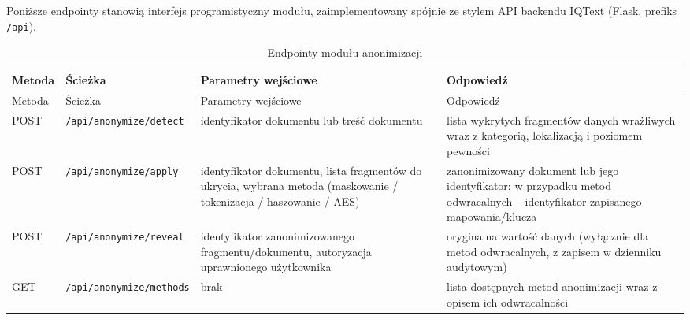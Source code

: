 
Poniższe endpointy stanowią interfejs programistyczny modułu, zaimplementowany spójnie ze stylem API backendu IQText (Flask, prefiks \texttt{/api}).

\begingroup
\small
\begin{longtable}{p{} p{} p{} p{}}
\caption{Endpointy modułu anonimizacji} \\
\toprule
\rowcolor{tablehead!15}
Metoda & Ścieżka & Parametry wejściowe & Odpowiedź \\
\midrule
\endfirsthead
\toprule
\rowcolor{tablehead!15}
Metoda & Ścieżka & Parametry wejściowe & Odpowiedź \\
\midrule
\endhead
POST & \texttt{/api/anonymize/\allowbreak detect} & identyfikator dokumentu lub treść dokumentu & lista wykrytych fragmentów danych wrażliwych wraz z kategorią, lokalizacją i poziomem pewności \\
POST & \texttt{/api/anonymize/\allowbreak apply} & identyfikator dokumentu, lista fragmentów do ukrycia, wybrana metoda (maskowanie / tokenizacja / haszowanie / AES) & zanonimizowany dokument lub jego identyfikator; w przypadku metod odwracalnych -- identyfikator zapisanego mapowania/klucza \\
POST & \texttt{/api/anonymize/\allowbreak reveal} & identyfikator zanonimizowanego fragmentu/dokumentu, autoryzacja uprawnionego użytkownika & oryginalna wartość danych (wyłącznie dla metod odwracalnych, z zapisem w dzienniku audytowym) \\
GET & \texttt{/api/anonymize/\allowbreak methods} & brak & lista dostępnych metod anonimizacji wraz z opisem ich odwracalności \\
\bottomrule
\end{longtable}
\endgroup
